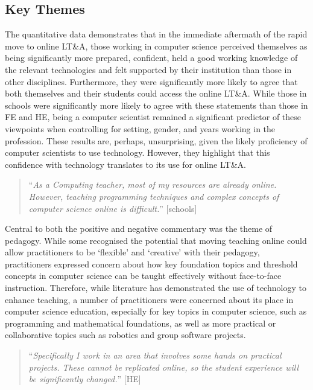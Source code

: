 \documentclass[sigconf]{acmart}
\begin{document}
\subsection{Key Themes}

The quantitative data demonstrates that in the immediate aftermath of
the rapid move to online LT\&A, those working in computer science
perceived themselves as being significantly more prepared, confident,
held a good working knowledge of the relevant technologies and felt
supported by their institution than those in other
disciplines. Furthermore, they were significantly more likely to agree
that both themselves and their students could access the online
LT\&A. While those in schools were significantly more likely to agree
with these statements than those in FE and HE, being a computer
scientist remained a significant predictor of these viewpoints when
controlling for setting, gender, and years working in the profession.
These results are, perhaps, unsurprising, given the likely proficiency of
computer scientists to use technology. However, they highlight that
this confidence with technology translates to its use for online LT\&A.

\begin{quotation}
``{\emph{As a Computing teacher, most of my resources are already
online. However, teaching programming techniques and complex concepts
of computer science online is difficult.}}'' [schools]
\end{quotation}

Central to both the positive and negative commentary was the theme of
pedagogy. While some recognised the potential that moving teaching
online could allow practitioners to be `flexible' and `creative' with
their pedagogy, practitioners expressed concern about how key
foundation topics and threshold concepts in computer science can be
taught effectively without face-to-face instruction. Therefore, while
literature has demonstrated the use of technology to enhance teaching,
a number of practitioners were concerned about its place in computer
science education, especially for key topics in computer science, such
as programming and mathematical foundations, as well as more practical
or collaborative topics such as robotics and group software projects.

\begin{quotation}
``{\emph{Specifically I work in an area that involves some hands on practical
projects. These cannot be replicated online, so the student experience
will be significantly changed.}}'' [HE]
\end{quotation}
\end{document}
